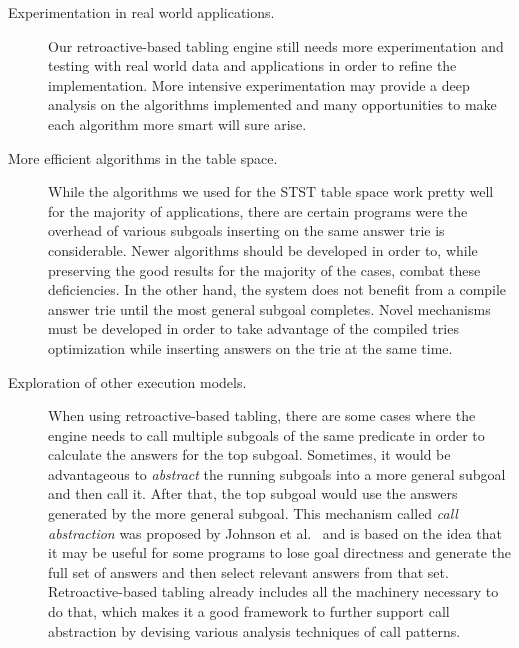 \begin{description}
   
   \item[Experimentation in real world applications.] Our retroactive-based tabling engine still needs more
   experimentation and testing with real world data and applications in order to refine the implementation.
   More intensive experimentation may provide a deep analysis on the algorithms implemented and many opportunities
   to make each algorithm more smart will sure arise.
   
   \item[More efficient algorithms in the table space.] While the algorithms we used for the STST table space
   work pretty well for the majority of applications, there are certain programs were the overhead of various
   subgoals inserting on the same answer trie is considerable. Newer algorithms should be developed in order to,
   while preserving the good results for the majority of the cases, combat these deficiencies. In the other hand,
   the system does not benefit from a compile answer trie until the most general subgoal completes. Novel mechanisms
   must be developed in order to take advantage of the compiled tries optimization while inserting answers on the trie
   at the same time.
   
   \item[Exploration of other execution models.] When using retroactive-based tabling, there are some cases where the
   engine needs to call multiple subgoals of the same predicate in order to calculate the answers for the top subgoal.
   Sometimes, it would be advantageous to \emph{abstract} the running subgoals into a more general subgoal and then
   call it. After that, the top subgoal would use the answers generated by the more general subgoal. This mechanism
   called \emph{call abstraction} was proposed by Johnson et al.~\cite{Johnson-99} and is based on the idea that it
   may be useful for some programs to lose goal directness and generate the full set of answers and then select relevant
   answers from that set. Retroactive-based tabling already includes all the machinery necessary to do that, which makes
   it a good framework to further support call abstraction by devising various analysis techniques of call patterns.
   
\end{description}